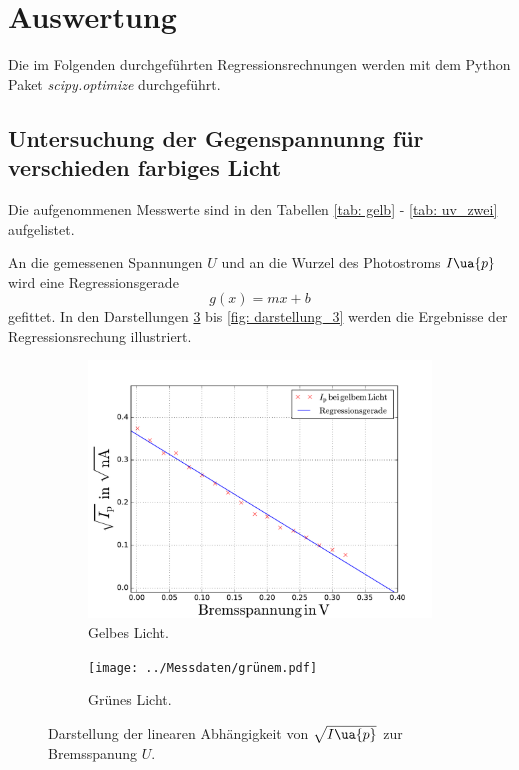 \section{Auswertung}

Die im Folgenden durchgeführten Regressionsrechnungen werden mit dem
Python Paket \emph{scipy.optimize}\cite{scipy} durchgeführt.

\subsection{Untersuchung der Gegenspannunng für verschieden farbiges Licht}
Die aufgenommenen Messwerte sind in den Tabellen \ref{tab: gelb} - \ref{tab: uv_zwei} aufgelistet.






An die gemessenen Spannungen $U$ und an die Wurzel des Photostroms $I\ua{p}$ wird eine
Regressionsgerade
\begin{equation}
  \label{eq:reg}
  g(x)=mx+b
\end{equation}
gefittet.
In den Darstellungen \ref{fig: darstellung_1} bis \ref{fig: darstellung_3} werden die Ergebnisse der Regressionsrechung
illustriert.
\begin{figure}
  \centering
  \begin{subfigure}{0.48\textwidth}
    \centering
    \includegraphics[width=1 \textwidth]{../Messdaten/gelbem.pdf}
    \caption{Gelbes Licht.}
    \label{fig: gelb}
  \end{subfigure}
  \begin{subfigure}{0.48\textwidth}
    \centering
    \texttt{[image: ../Messdaten/grünem.pdf]}
    \caption{Grünes Licht.}
    \label{fig: grün}
  \end{subfigure}
  \caption{Darstellung der linearen Abhängigkeit von $\sqrt{I\ua{p}}$ zur Bremsspanung $U$.}
  \label{fig: darstellung_1}
\end{figure}
